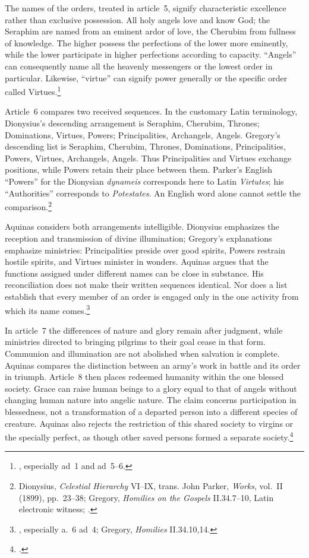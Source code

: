 The names of the orders, treated in article~5, signify characteristic excellence rather than exclusive possession. All holy angels love and know God; the Seraphim are named from an eminent ardor of love, the Cherubim from fullness of knowledge. The higher possess the perfections of the lower more eminently, while the lower participate in higher perfections according to capacity. ``Angels'' can consequently name all the heavenly messengers or the lowest order in particular. Likewise, ``virtue'' can signify power generally or the specific order called Virtues.\footnote{, especially ad~1 and ad~5--6.}

Article~6 compares two received sequences. In the customary Latin terminology, Dionysius's descending arrangement is Seraphim, Cherubim, Thrones; Dominations, Virtues, Powers; Principalities, Archangels, Angels. Gregory's descending list is Seraphim, Cherubim, Thrones, Dominations, Principalities, Powers, Virtues, Archangels, Angels. Thus Principalities and Virtues exchange positions, while Powers retain their place between them. Parker's English ``Powers'' for the Dionysian \emph{dynameis} corresponds here to Latin \emph{Virtutes}; his ``Authorities'' corresponds to \emph{Potestates}. An English word alone cannot settle the comparison.\footnote{Dionysius, \emph{Celestial Hierarchy} VI--IX, trans. John Parker, \emph{Works}, vol.~II (1899), pp.~23--38; Gregory, \emph{Homilies on the Gospels} II.34.7--10, Latin electronic witness; .}

Aquinas considers both arrangements intelligible. Dionysius emphasizes the reception and transmission of divine illumination; Gregory's explanations emphasize ministries: Principalities preside over good spirits, Powers restrain hostile spirits, and Virtues minister in wonders. Aquinas argues that the functions assigned under different names can be close in substance. His reconciliation does not make their written sequences identical. Nor does a list establish that every member of an order is engaged only in the one activity from which its name comes.\footnote{, especially a.~6 ad~4; Gregory, \emph{Homilies} II.34.10,14.}

In article~7 the differences of nature and glory remain after judgment, while ministries directed to bringing pilgrims to their goal cease in that form. Communion and illumination are not abolished when salvation is complete. Aquinas compares the distinction between an army's work in battle and its order in triumph. Article~8 then places redeemed humanity within the one blessed society. Grace can raise human beings to a glory equal to that of angels without changing human nature into angelic nature. The claim concerns participation in blessedness, not a transformation of a departed person into a different species of creature. Aquinas also rejects the restriction of this shared society to virgins or the specially perfect, as though other saved persons formed a separate society.\footnote{.}


